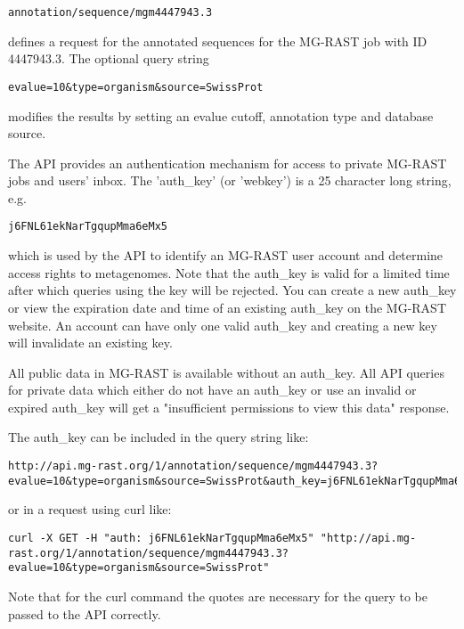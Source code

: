 \begin{small}
\begin{verbatim}
annotation/sequence/mgm4447943.3
\end{verbatim}
\end{small} defines a request for the annotated sequences for the MG-RAST job with ID 4447943.3. 
The optional query string 

\begin{small}
\begin{verbatim}
evalue=10&type=organism&source=SwissProt
\end{verbatim}
\end{small} modifies the results by setting an evalue cutoff, annotation type and database source.

The API provides an authentication mechanism for access to private MG-RAST jobs and users' inbox. The 'auth\_key' (or 'webkey') is a 25 character long string, e.g.

\begin{small}
\begin{verbatim}
j6FNL61ekNarTgqupMma6eMx5
\end{verbatim}
\end{small} which is used by the API to identify an MG-RAST user account and determine access rights to metagenomes. Note that the auth\_key is valid for a limited time after which queries using the key will be rejected. You can create a new auth\_key or view the expiration date and time of an existing auth\_key on the MG-RAST website. An account can have only one valid auth\_key and creating a new key will invalidate an existing key.

All public data in MG-RAST is available without an auth\_key. All API queries for private data which either do not have an auth\_key or use an invalid or expired auth\_key will get a "insufficient permissions to view this data" response.

The auth\_key can be included in the query string like:
\begin{small}
\begin{lstlisting}
http://api.mg-rast.org/1/annotation/sequence/mgm4447943.3?evalue=10&type=organism&source=SwissProt&auth_key=j6FNL61ekNarTgqupMma6eMx5
\end{lstlisting}
\end{small} or in a request using curl like:
\begin{small}
\begin{lstlisting}
curl -X GET -H "auth: j6FNL61ekNarTgqupMma6eMx5" "http://api.mg-rast.org/1/annotation/sequence/mgm4447943.3?evalue=10&type=organism&source=SwissProt"
\end{lstlisting}
\end{small} Note that for the curl command the quotes are necessary for the query to be passed to the API correctly.

